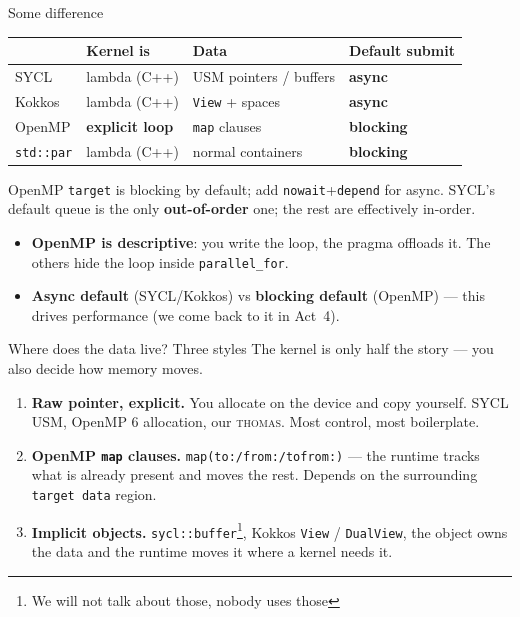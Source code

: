 \begin{frame}{Some difference}
\begin{center}
\begin{tabular}{@{}llll@{}}
\toprule
 & Kernel is & Data & Default submit \\
\midrule
SYCL           & lambda (C++)    & USM pointers / buffers   & \textbf{async} \\
Kokkos         & lambda (C++)    & \texttt{View} + spaces   & \textbf{async} \\
OpenMP         & \textbf{explicit loop} & \texttt{map} clauses & \textbf{blocking} \\
\texttt{std::par} & lambda (C++) & normal containers        & \textbf{blocking} \\
\bottomrule
\end{tabular}
\end{center}
{\footnotesize OpenMP \texttt{target} is blocking by default; add \texttt{nowait}+\texttt{depend} for async.}
{\footnotesize SYCL's default queue is the only \textbf{out-of-order} one; the rest are effectively in-order.}

\begin{itemize}
    \item \textbf{OpenMP is descriptive}: you write the loop, the pragma offloads it.
          The others hide the loop inside \texttt{parallel\_for}.
    \item \textbf{Async default} (SYCL/Kokkos) vs \textbf{blocking default} (OpenMP)
          --- this drives performance (we come back to it in Act~4).
\end{itemize}
\end{frame}

\begin{frame}{Where does the data live? Three styles}
The kernel is only half the story --- you also decide how memory moves.
\begin{enumerate}
    \item \textbf{Raw pointer, explicit.} You allocate on the device and copy
          yourself. SYCL USM, OpenMP 6 allocation, our \textsc{thomas}.
          Most control, most boilerplate.
    \item \textbf{OpenMP \texttt{map} clauses.} \texttt{map(to:/from:/tofrom:)} ---
          the runtime tracks what is already present and moves the rest. Depends on
          the surrounding \texttt{target data} region.
    \item \textbf{Implicit objects.} \texttt{sycl::buffer}\footnote{We will not talk about those, nobody uses those}, Kokkos \texttt{View} /
          \texttt{DualView}, the object owns the data and the runtime moves it
          where a kernel needs it.
\end{enumerate}

\end{frame}

